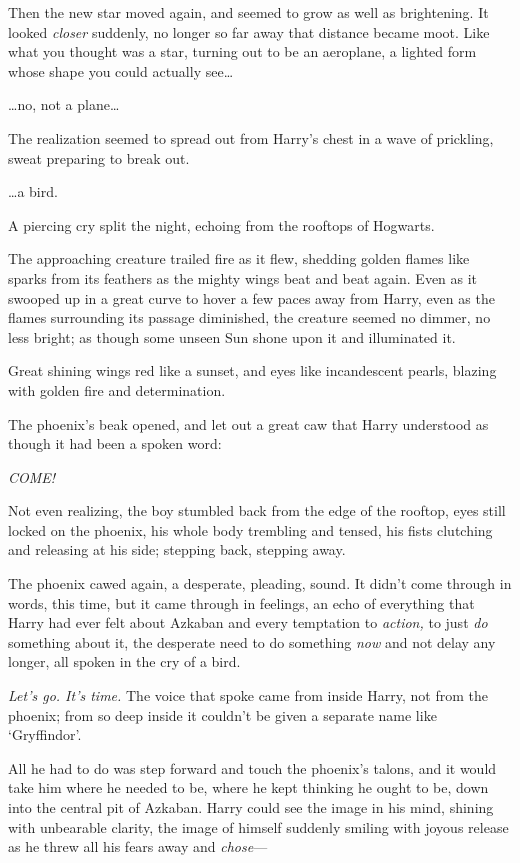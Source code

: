 Then the new star moved again, and seemed to grow as well as brightening. It looked \emph{closer} suddenly, no longer so far away that distance became moot. Like what you thought was a star, turning out to be an aeroplane, a lighted form whose shape you could actually see…

…no, not a plane…

The realization seemed to spread out from Harry’s chest in a wave of prickling, sweat preparing to break out.

…a bird.

A piercing cry split the night, echoing from the rooftops of Hogwarts.

The approaching creature trailed fire as it flew, shedding golden flames like sparks from its feathers as the mighty wings beat and beat again. Even as it swooped up in a great curve to hover a few paces away from Harry, even as the flames surrounding its passage diminished, the creature seemed no dimmer, no less bright; as though some unseen Sun shone upon it and illuminated it.

Great shining wings red like a sunset, and eyes like incandescent pearls, blazing with golden fire and determination.

The phoenix’s beak opened, and let out a great caw that Harry understood as though it had been a spoken word:

\emph{COME!}

Not even realizing, the boy stumbled back from the edge of the rooftop, eyes still locked on the phoenix, his whole body trembling and tensed, his fists clutching and releasing at his side; stepping back, stepping away.

The phoenix cawed again, a desperate, pleading, sound. It didn’t come through in words, this time, but it came through in feelings, an echo of everything that Harry had ever felt about Azkaban and every temptation to \emph{action,} to just \emph{do} something about it, the desperate need to do something \emph{now} and not delay any longer, all spoken in the cry of a bird.

\emph{Let’s go. It’s time.} The voice that spoke came from inside Harry, not from the phoenix; from so deep inside it couldn’t be given a separate name like ‘Gryffindor’.

All he had to do was step forward and touch the phoenix’s talons, and it would take him where he needed to be, where he kept thinking he ought to be, down into the central pit of Azkaban. Harry could see the image in his mind, shining with unbearable clarity, the image of himself suddenly smiling with joyous release as he threw all his fears away and \emph{chose}—

